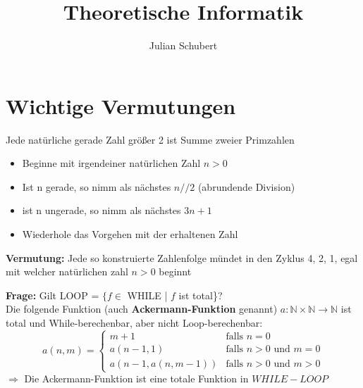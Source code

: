 \documentclass[14pt]{article}
\title{Theoretische Informatik}
\author{Julian Schubert}
\begin{document}
    \maketitle
    \tableofcontents

    \newpage

    \section{Wichtige Vermutungen}
    \begin{definition}
        Jede natürliche gerade Zahl größer 2 ist Summe zweier Primzahlen
    \end{definition}
    \begin{definition}
        \begin{itemize}
            \item Beginne mit irgendeiner natürlichen Zahl $n > 0$
            \item Ist n gerade, so nimm als nächstes $n // 2$ (abrundende Division)
            \item ist n ungerade, so nimm als nächstes $3n + 1$
            \item Wiederhole das Vorgehen mit der erhaltenen Zahl
        \end{itemize}
        \noindent
        \textbf{Vermutung:} Jede so konstruierte Zahlenfolge mündet in den Zyklus
            4, 2, 1, egal mit welcher natürlichen zahl $n > 0$ beginnt
    \end{definition}
    \begin{definition}
        \textbf{Frage:} Gilt LOOP = $\{f \in$ WHILE | $f$ ist total\}? \\
        Die folgende Funktion (auch \textbf{Ackermann-Funktion} genannt)
        $a: \mathbb{N} \times \mathbb{N} \rightarrow \mathbb{N}$ ist
        total und While-berechenbar, aber nicht Loop-berechenbar: \\
        \begin{equation*}
            a(n, m) = 
            \begin{cases}
                m + 1 & \text{falls $n = 0$} \\
                a(n - 1, 1) & \text{falls $n > 0$ und $m = 0$} \\
                a(n - 1, a(n, m - 1)) & \text{falls $n > 0$ und $m > 0$}
            \end{cases}
        \end{equation*}
        $\Rightarrow$ Die Ackermann-Funktion ist eine totale Funktion in 
        $WHILE-LOOP$
    \end{definition}
\end{document}
